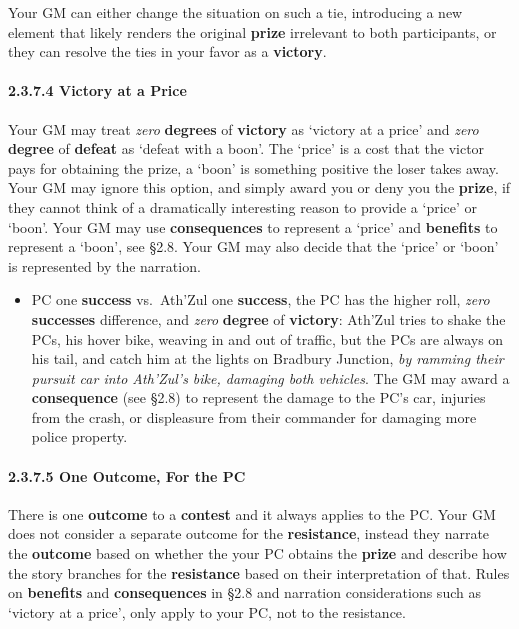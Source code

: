 \documentclass[
  11pt,
]{article}
\providecommand{\tightlist}{%
  \setlength{\itemsep}{0pt}\setlength{\parskip}{0pt}}
\begin{document}
Your GM can either change the situation on such a tie, introducing a new
element that likely renders the original \textbf{prize} irrelevant to
both participants, or they can resolve the ties in your favor as a
\textbf{victory}.

\hypertarget{victory-at-a-price}{%
\paragraph{2.3.7.4 Victory at a Price}\label{victory-at-a-price}}

Your GM may treat \emph{zero} \textbf{degrees} of \textbf{victory} as
`victory at a price' and \emph{zero} \textbf{degree} of \textbf{defeat}
as `defeat with a boon'. The `price' is a cost that the victor pays for
obtaining the prize, a `boon' is something positive the loser takes
away. Your GM may ignore this option, and simply award you or deny you
the \textbf{prize}, if they cannot think of a dramatically interesting
reason to provide a `price' or `boon'. Your GM may use
\textbf{consequences} to represent a `price' and \textbf{benefits} to
represent a `boon', see §2.8. Your GM may also decide that the `price'
or `boon' is represented by the narration.

\begin{itemize}
\tightlist
\item
  PC one \textbf{success} vs.~Ath'Zul one \textbf{success}, the PC has
  the higher roll, \emph{zero} \textbf{successes} difference, and
  \emph{zero} \textbf{degree} of \textbf{victory}: Ath'Zul tries to
  shake the PCs, his hover bike, weaving in and out of traffic, but the
  PCs are always on his tail, and catch him at the lights on Bradbury
  Junction, \emph{by ramming their pursuit car into Ath'Zul's bike,
  damaging both vehicles}. The GM may award a \textbf{consequence} (see
  §2.8) to represent the damage to the PC's car, injuries from the
  crash, or displeasure from their commander for damaging more police
  property.
\end{itemize}

\hypertarget{one-outcome-for-the-pc}{%
\paragraph{2.3.7.5 One Outcome, For the
PC}\label{one-outcome-for-the-pc}}

There is one \textbf{outcome} to a \textbf{contest} and it always
applies to the PC. Your GM does not consider a separate outcome for the
\textbf{resistance}, instead they narrate the \textbf{outcome} based on
whether the your PC obtains the \textbf{prize} and describe how the
story branches for the \textbf{resistance} based on their interpretation
of that. Rules on \textbf{benefits} and \textbf{consequences} in §2.8
and narration considerations such as `victory at a price', only apply to
your PC, not to the resistance.
\end{document}
